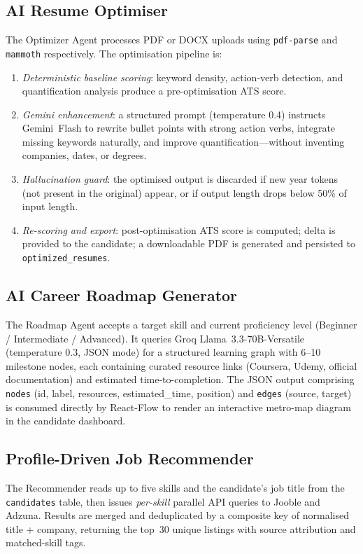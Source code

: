 \documentclass[conference]{IEEEtran}
\begin{document}
\subsection{AI Resume Optimiser}

The Optimizer Agent processes PDF or DOCX uploads using \texttt{pdf-parse} and \texttt{mammoth} respectively. The optimisation pipeline is:
\begin{enumerate}
\item \textit{Deterministic baseline scoring}: keyword density, action-verb detection, and quantification analysis produce a pre-optimisation ATS score.
\item \textit{Gemini enhancement}: a structured prompt (temperature 0.4) instructs Gemini~Flash to rewrite bullet points with strong action verbs, integrate missing keywords naturally, and improve quantification—without inventing companies, dates, or degrees.
\item \textit{Hallucination guard}: the optimised output is discarded if new year tokens (not present in the original) appear, or if output length drops below 50\% of input length.
\item \textit{Re-scoring and export}: post-optimisation ATS score is computed; delta is provided to the candidate; a downloadable PDF is generated and persisted to \texttt{optimized\_resumes}.
\end{enumerate}

\subsection{AI Career Roadmap Generator}

The Roadmap Agent accepts a target skill and current proficiency level (Beginner / Intermediate / Advanced). It queries Groq Llama~3.3-70B-Versatile (temperature 0.3, JSON mode) for a structured learning graph with 6--10 milestone nodes, each containing curated resource links (Coursera, Udemy, official documentation) and estimated time-to-completion. The JSON output comprising \texttt{nodes} (id, label, resources, estimated\_time, position) and \texttt{edges} (source, target) is consumed directly by React-Flow to render an interactive metro-map diagram in the candidate dashboard.

\subsection{Profile-Driven Job Recommender}

The Recommender reads up to five skills and the candidate's job title from the \texttt{candidates} table, then issues \emph{per-skill} parallel API queries to Jooble and Adzuna. Results are merged and deduplicated by a composite key of normalised title + company, returning the top~30 unique listings with source attribution and matched-skill tags.
\end{document}
